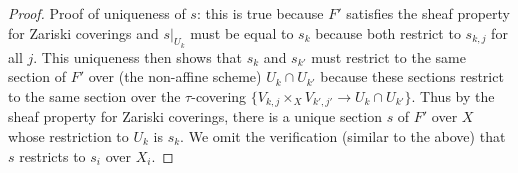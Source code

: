 \documentclass[10pt,a4paper]{amsart}
\theoremstyle{plain}
\theoremstyle{definition}
\theoremstyle{remark}
\numberwithin{equation}{subsection}
\begin{document}
\begin{proof}
\medskip\noindent
Proof of uniqueness of $s$: this is true because $F'$ satisfies
the sheaf property for Zariski coverings and $s|_{U_k}$ must be equal
to $s_k$ because both restrict to $s_{k, j}$ for all $j$.
This uniqueness then shows that $s_k$ and $s_{k'}$ must restrict
to the same section of $F'$ over (the non-affine scheme) $U_k \cap U_{k'}$
because these sections restrict to the same section over the
$\tau$-covering $\{V_{k, j} \times_X V_{k', j'} \to U_k \cap U_{k'}\}$.
Thus by the sheaf property for Zariski coverings, there is a unique
section $s$ of $F'$ over $X$ whose restriction to $U_k$ is $s_k$.
We omit the verification (similar to the above) that $s$ restricts
to $s_i$ over $X_i$.
\end{proof}
\end{document}
